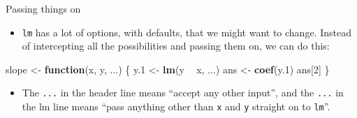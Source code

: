 \documentclass[ignorenonframetext,]{beamer}
\newenvironment{Shaded}{\begin{snugshade}}{\end{snugshade}}
\newcommand{\ControlFlowTok}[1]{\textcolor[rgb]{0.13,0.29,0.53}{\textbf{#1}}}
\newcommand{\DecValTok}[1]{\textcolor[rgb]{0.00,0.00,0.81}{#1}}
\newcommand{\FloatTok}[1]{\textcolor[rgb]{0.00,0.00,0.81}{#1}}
\newcommand{\KeywordTok}[1]{\textcolor[rgb]{0.13,0.29,0.53}{\textbf{#1}}}
\newcommand{\NormalTok}[1]{#1}
\newcommand{\OperatorTok}[1]{\textcolor[rgb]{0.81,0.36,0.00}{\textbf{#1}}}
\newcommand{\StringTok}[1]{\textcolor[rgb]{0.31,0.60,0.02}{#1}}
\providecommand{\tightlist}{%
  \setlength{\itemsep}{0pt}\setlength{\parskip}{0pt}}
\begin{document}
\begin{frame}[fragile]{Passing things on}
\protect\hypertarget{passing-things-on}{}

\begin{itemize}
\tightlist
\item
  \texttt{lm} has a lot of options, with defaults, that we might want to
  change. Instead of intercepting all the possibilities and passing them
  on, we can do this:
\end{itemize}

\begin{Shaded}
\begin{Highlighting}[]
\NormalTok{slope <-}\StringTok{ }\ControlFlowTok{function}\NormalTok{(x, y, ...) \{}
\NormalTok{  y}\FloatTok{.1}\NormalTok{ <-}\StringTok{ }\KeywordTok{lm}\NormalTok{(y }\OperatorTok{~}\StringTok{ }\NormalTok{x, ...)}
\NormalTok{  ans <-}\StringTok{ }\KeywordTok{coef}\NormalTok{(y}\FloatTok{.1}\NormalTok{)}
\NormalTok{  ans[}\DecValTok{2}\NormalTok{]}
\NormalTok{\}}
\end{Highlighting}
\end{Shaded}

\begin{itemize}
\tightlist
\item
  The \texttt{...} in the header line means ``accept any other input'',
  and the \texttt{...} in the lm line means ``pass anything other than
  \texttt{x} and \texttt{y} straight on to \texttt{lm}''.
\end{itemize}

\end{frame}
\end{document}
